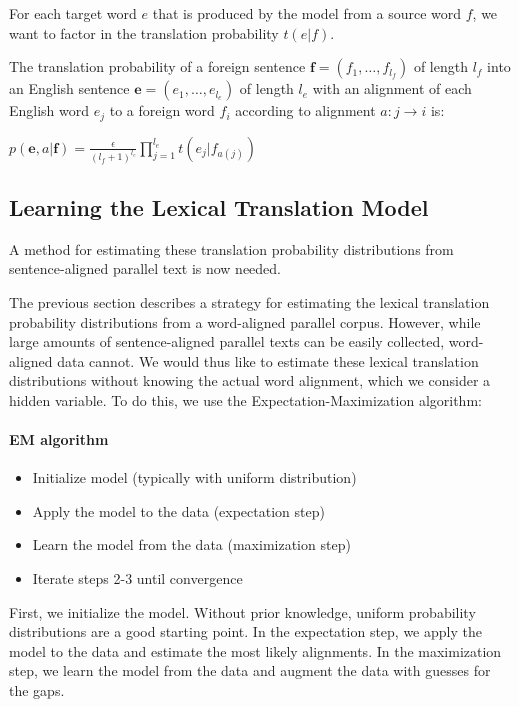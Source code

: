 \documentclass[11pt]{book}
\theoremstyle{plain}
\begin{document}
For each target word $e$ that is produced by the model from a source
word $f$, we want to factor in the translation probability $t(e|f)$.

The translation probability of a foreign sentence
$\textbf{f}=(f_1,\dots,f_{l_f})$ of length $l_f$ into an English
sentence $\textbf{e}=(e_1,\dots, e_{l_e})$ of length $l_e$ with an
alignment of each English word $e_j$ to a foreign word $f_i$
according to alignment $a:j \rightarrow i$ is:

\begin{center}
$p(\textbf{e},a|\textbf{f}) = \frac{\epsilon}{(l_f +
1)^{l_e}}\prod_{j=1}^{l_e} t(e_j|f_{a(j)})$
\end{center}


\subsection{Learning the Lexical Translation Model}

A method for estimating these translation probability distributions
from sentence-aligned parallel text is now needed.

The previous section describes a strategy for estimating the lexical
translation probability distributions from a word-aligned parallel
corpus. However, while large amounts of sentence-aligned parallel
texts can be easily collected, word-aligned data cannot. We would
thus like to estimate these lexical translation distributions
without knowing the actual word alignment, which we consider a
hidden variable. To do this, we use the Expectation-Maximization
algorithm:

\paragraph{EM algorithm}
\begin{itemize}
\item{Initialize model (typically with uniform distribution)}
\item{Apply the model to the data (expectation step)}
\item{Learn the model from the data (maximization step)}
\item{Iterate steps 2-3 until convergence}
\end{itemize}

First, we initialize the model. Without prior knowledge, uniform
probability distributions are a good starting point. In the
expectation step, we apply the model to the data and estimate the
most likely alignments. In the maximization step, we learn the model
from the data and augment the data with guesses for the gaps.
\end{document}
